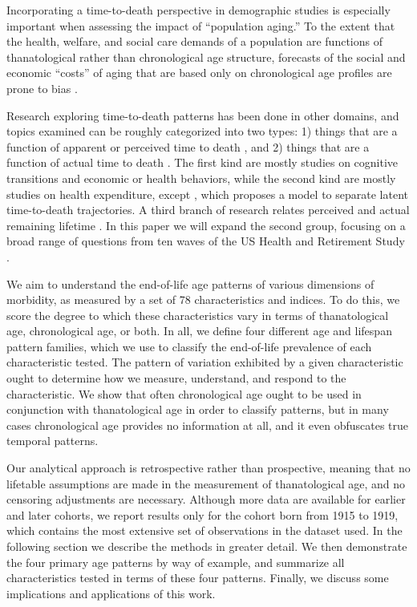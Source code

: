 \documentclass[11pt,oneside]{article} %
\begin{document}
Incorporating a time-to-death perspective in demographic studies is especially
important when assessing the impact of ``population aging.''
To the extent that the health, welfare, and social care demands of a
population are functions of thanatological rather than chronological age
structure, forecasts of the social and economic ``costs'' of aging that are
based only on chronological age profiles are prone to bias
\citep{stearns2004time}.

Research exploring time-to-death patterns has been done in other
domains, and topics examined can be roughly categorized into two types: 1)
things that are a function of apparent or perceived time to death
\citep{hamermesh1985expectations,hurd1995evaluation,carstensen2006influence,gan2004subjective,biro2010subjective,salm2010subjective,van2010living,cocco2012longevity,payne2013life,balia2013survival},
and 2) things that are a function of actual time to death
\citep{miller2001increasing,seshamani2004longitudinal,werblow2007population,
wolf2015disability,stearns2004time}.
The first kind are mostly studies on cognitive transitions and economic or
health behaviors, while the second kind are mostly studies on health
expenditure, except \citet{wolf2015disability}, which proposes a model to
separate latent time-to-death trajectories.
A third branch of research relates perceived and actual remaining lifetime
\citep{perozek2008using,delavande2011differential,post2012longevity,kutlu2013individuals}.
In this paper we will expand the second group, focusing on a broad range of
questions from ten waves of the US Health and Retirement Study \citep{HRS}.

We aim to understand the end-of-life age patterns of various dimensions of
morbidity, as measured by a set of 78 characteristics and indices. To do this,
we score the degree to which these characteristics vary in terms of thanatological
age, chronological age, or both. In all, we define four different age and
lifespan pattern families, which we use to classify the end-of-life prevalence
of each characteristic tested. The pattern of variation exhibited by a given
characteristic ought to determine how we measure, understand, and respond to the
characteristic. We show that often chronological age ought to be used in conjunction with thanatological age in order to classify patterns, but in many cases
chronological age provides no information at all, and it even obfuscates true temporal
patterns.

Our analytical approach is retrospective rather than
prospective, meaning that no lifetable assumptions are made in the measurement
of thanatological age, and no censoring adjustments are necessary. Although more
data are available for earlier and later cohorts, we report results only for the
cohort born from 1915 to 1919, which contains the most extensive set of observations in
the dataset used. In the following section we describe the methods in
greater detail. We then demonstrate the four primary age patterns by way of
example, and summarize all characteristics tested in terms of these four
patterns.
Finally, we discuss some implications and applications of this work.
\end{document}

